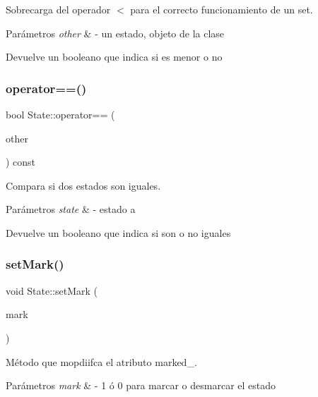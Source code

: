Sobrecarga del operador $<$ para el correcto funcionamiento de un set. 


\begin{DoxyParams}{Parámetros}
{\em other} & -\/ un estado, objeto de la clase \\
\hline
\end{DoxyParams}
\begin{DoxyReturn}{Devuelve}
un booleano que indica si es menor o no 
\end{DoxyReturn}
\mbox{\label{classState_ab98d310aaceb21737346521c5bc6fc6c}} 
\subsubsection{\texorpdfstring{operator==()}{operator==()}}
{\footnotesize\ttfamily bool State\+::operator== (\begin{DoxyParamCaption}\item[{const \hyperlink{classState}{State} \&}]{other }\end{DoxyParamCaption}) const}



Compara si dos estados son iguales. 


\begin{DoxyParams}{Parámetros}
{\em state} & -\/ estado a \\
\hline
\end{DoxyParams}
\begin{DoxyReturn}{Devuelve}
un booleano que indica si son o no iguales 
\end{DoxyReturn}
\mbox{\label{classState_af07f99f41c5c3dc6154ccf420cdbbe27}} 
\subsubsection{\texorpdfstring{set\+Mark()}{setMark()}}
{\footnotesize\ttfamily void State\+::set\+Mark (\begin{DoxyParamCaption}\item[{bool}]{mark }\end{DoxyParamCaption})}



Método que mopdiifca el atributo marked\+\_\+. 


\begin{DoxyParams}{Parámetros}
{\em mark} & -\/ 1 ó 0 para marcar o desmarcar el estado \\
\hline
\end{DoxyParams}
\mbox{\label{classState_a5b357108140ecc1442dac9a10fa4b43a}} 
